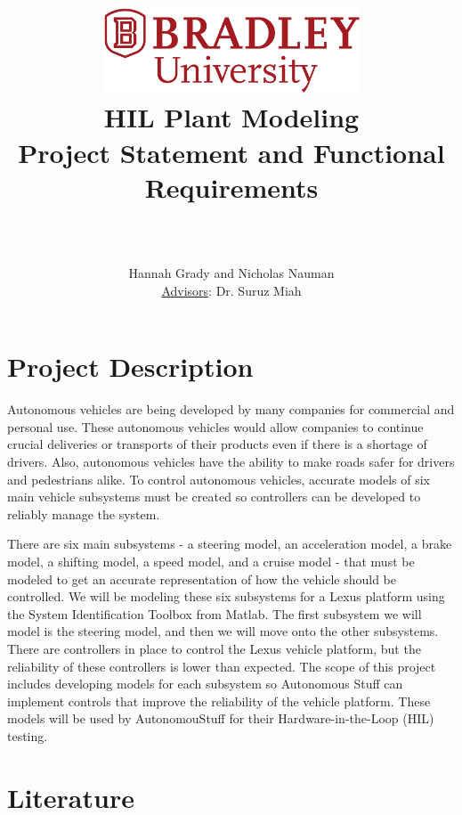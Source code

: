 \documentclass[12pt]{article} %
\title{
    \begin{center}
        \href{http://www.bradley.edu}{\includegraphics[height=1in]{figs/logoBU1-Print}}
        \vskip10pt
        \HRule \\[0.4cm]
        {\Huge \bfseries HIL Plant Modeling \\\Large Project Statement and Functional Requirements}\\[0.4cm] %
        \HRule \\[0.4cm]
    \end{center}
    }
\author{Hannah Grady and Nicholas Nauman \\ \underline{Advisors}: Dr. Suruz Miah}
\begin{document}
\maketitle

\newpage %

\section{Project Description}
Autonomous vehicles are being developed by many companies for commercial and personal use. These autonomous vehicles would allow companies to continue crucial deliveries or transports of their products even if there is a shortage of drivers. Also, autonomous vehicles have the ability to make roads safer for drivers and pedestrians alike. To control autonomous vehicles, accurate models of six main vehicle subsystems must be created so controllers can be developed to reliably manage the system.

There are six main subsystems - a steering model, an acceleration model, a brake model, a shifting model, a speed model, and a cruise model - that must be modeled to get an accurate representation of how the vehicle should be controlled. We will be modeling these six subsystems for a Lexus platform using the System Identification Toolbox from Matlab. The first subsystem we will model is the steering model, and then we will move onto the other subsystems. There are controllers in place to control the Lexus vehicle platform, but the reliability of these controllers is lower than expected. The scope of this project includes developing models for each subsystem so Autonomous Stuff can implement controls that improve the reliability of the vehicle platform. These models will be used by AutonomouStuff for their Hardware-in-the-Loop (HIL) testing. 


\section{Literature}
\label{sec:Literature}
\end{document}
